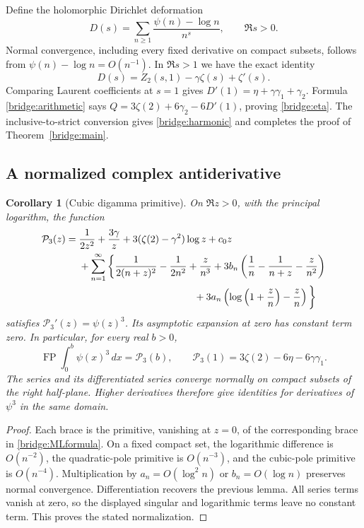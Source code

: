 \documentclass[11pt]{article}
\numberwithin{equation}{section}
\newtheorem{corollary}[theorem]{Corollary}
\theoremstyle{definition}
\theoremstyle{remark}
\begin{document}
Define the holomorphic Dirichlet deformation
\[
 D(s)=\sum_{n\ge1}\frac{\psi(n)-\log n}{n^s},\qquad\Re s>0.
\]
Normal convergence, including every fixed derivative on compact
subsets, follows from $\psi(n)-\log n=O(n^{-1})$.
In $\Re s>1$ we have the exact identity
\[
 D(s)=Z_2(s,1)-\gamma\zeta(s)+\zeta'(s).
\]
Comparing Laurent coefficients at $s=1$ gives
$D'(1)=\eta+\gamma\gamma_1+\gamma_2$.  Formula
\eqref{bridge:arithmetic} says
$Q=3\zeta(2)+6\gamma_2-6D'(1)$, proving
\eqref{bridge:eta}.  The inclusive-to-strict conversion gives
\eqref{bridge:harmonic} and completes the proof of
Theorem~\ref{bridge:main}.

\subsection{A normalized complex antiderivative}

\begin{corollary}[Cubic digamma primitive]\label{bridge:primitive}
On $\Re z>0$, with the principal logarithm, the function
\begin{align}
 \mathcal P_3(z)={}&\frac1{2z^2}+\frac{3\gamma}z
       +3(\zeta(2)-\gamma^2)\log z+c_0z\notag\\
 &+\sum_{n=1}^{\infty}\bigg\{
      \frac1{2(n+z)^2}-\frac1{2n^2}+\frac{z}{n^3}
      +3b_n\left(\frac1n-\frac1{n+z}-\frac z{n^2}\right)
        \notag\\
 &\hspace{41mm}
      +3a_n\left(\log\left(1+\frac zn\right)-\frac zn\right)
        \bigg\}
 \label{bridge:primitiveformula}
\end{align}
satisfies $\mathcal P_3'(z)=\psi(z)^3$.  Its asymptotic expansion at
zero has constant term zero.  In particular, for every real $b>0$,
\[
 \operatorname{FP}\int_0^b\psi(x)^3\,dx=\mathcal P_3(b),
 \qquad \mathcal P_3(1)=3\zeta(2)-6\eta-6\gamma\gamma_1.
\]
The series and its differentiated series converge normally on compact
subsets of the right half-plane.  Higher derivatives therefore give
identities for derivatives of $\psi^3$ in the same domain.
\end{corollary}

\begin{proof}
Each brace is the primitive, vanishing at $z=0$, of the corresponding
brace in \eqref{bridge:MLformula}.  On a fixed compact set,
the logarithmic difference is $O(n^{-2})$, the quadratic-pole
primitive is $O(n^{-3})$, and the cubic-pole primitive is $O(n^{-4})$.
Multiplication by $a_n=O(\log^2 n)$ or $b_n=O(\log n)$ preserves
normal convergence.  Differentiation recovers the previous lemma.
All series terms vanish at zero, so the displayed singular and logarithmic
terms leave no constant term.  This proves the stated normalization.
\end{proof}
\end{document}

